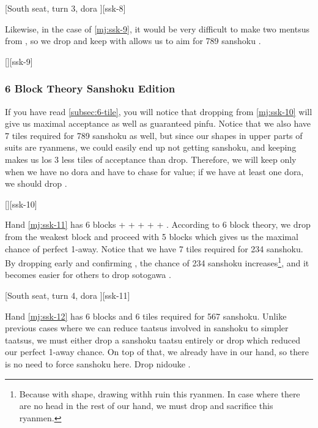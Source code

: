 \documentclass[12pt]{article}
\newlength\stdbls %
\newcommand{\mjfn}[1]{\raisebox{-.135\stdbls}{\mahjong[0.75\stdbls]{#1}}}
\begin{document}
[South seat, turn 3, dora ][ssk-8]

Likewise, in the case of \ref{mj:ssk-9}, it would be very difficult to make two mentsus from , so we drop  and keep  with allows us to aim for 789 sanshoku \citep{gendai-ssk}.

[][ssk-9]


\subsubsection*{6 Block Theory Sanshoku Edition}

If you have read \ref{subsec:6-tile}, you will notice that dropping  from \ref{mj:ssk-10} will give us maximal acceptance as well as guaranteed pinfu. Notice that we also have 7 tiles required for 789 sanshoku as well, but since our shapes in upper parts of suits are ryanmens, we could easily end up not getting sanshoku, and keeping  makes us los 3 less tiles of acceptance than  drop. Therefore, we will keep  only when we have no dora and have to chase for value; if we have at least one dora, we should drop  \citep{gendai-ssk}.

[][ssk-10]

Hand \ref{mj:ssk-11} has 6 blocks  +  +  +  +  + . According to 6 block theory, we drop  from the weakest block and proceed with 5 blocks which gives us the maximal chance of perfect 1-away. Notice that we have 7 tiles required for 234 sanshoku. By dropping  early and confirming , the chance of 234 sanshoku increases\footnote{Because with \mjfn{334m} shape, drawing \mjfn{3m} withh ruin this ryanmen. In case where there are no head in the rest of our hand, we must drop \mjfn{4m} and sacrifice this ryanmen.}, and it becomes easier for others to drop sotogawa  \citep[][p.~65]{zero-teyaku}.

[South seat, turn 4, dora ][ssk-11]

Hand \ref{mj:ssk-12} has 6 blocks and 6 tiles required for 567 sanshoku. Unlike previous cases where we can reduce taatsus involved in sanshoku to simpler taatsus, we must either drop a sanshoku taatsu entirely or drop  which reduced our perfect 1-away chance. On top of that, we already have  in our hand, so there is no need to force sanshoku here. Drop nidouke  \citep{gendai-ssk}.
\end{document}
